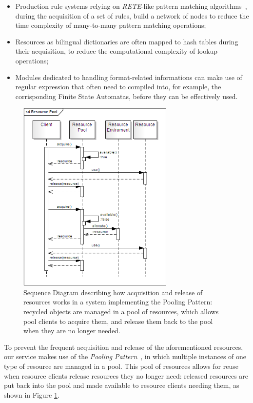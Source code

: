 \documentclass[11pt]{article}
\begin{document}
\begin{itemize}
 \item Production rule systems relying on \emph{RETE}-like pattern matching algorithms~\citep{forgy}, during the acquisition of a set of rules, build a network of nodes to reduce the time complexity of many-to-many pattern matching operations;
 \item Resources as bilingual dictionaries are often mapped to hash tables during their acquisition, to reduce the computational complexity of lookup operations;
 \item Modules dedicated to handling format-related informations can make use of regular expression that often need to compiled into, for example, the corrisponding Finite State Automatas, before they can be effectively used.
\end{itemize}

\begin{figure}[!ht]
\begin{center}
\includegraphics[width=7.75cm]{resource_pool}
\end{center}
\caption{Sequence Diagram describing how acquisition and release of resources works in a system implementing the Pooling Pattern: recycled objects are managed in a pool of resources, which allows pool clients to acquire them, and release them back to the pool when they are no longer needed.}
\label{fig:rp}
\end{figure}

To prevent the frequent acquisition and release of the aforementioned resources, our service makes use of the \emph{Pooling Pattern}~\citep{kircher2001}, in which multiple instances of one type of resource are managed in a pool.  This pool of resources allows for reuse when resource clients release resources they no longer need: released resources are put back into the pool and made available to resource clients needing them, as shown in Figure \ref{fig:rp}.
\end{document}
